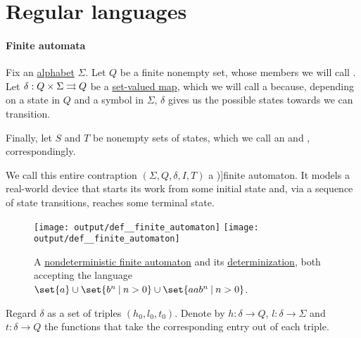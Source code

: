 \section{Regular languages}\label{sec:regular_languages}

\paragraph{Finite automata}

\begin{definition}\label{def:finite_automaton}
  Fix an \hyperref[def:formal_language]{alphabet} \( \Sigma \). Let \( Q \) be a finite nonempty set, whose members we will call . Let \( \delta: Q \times \Sigma \rightrightarrows Q \) be a \hyperref[def:set_valued_map]{set-valued map}, which we will call a  because, depending on a state in \( Q \) and a symbol in \( \Sigma \), \( \delta \) gives us the possible states towards we can transition.

  Finally, let \( S \) and \( T \) be nonempty sets of states, which we call an  and , correspondingly.

  We call this entire contraption \( (\Sigma, Q, \delta, I, T) \) a \term[ru=конечный автомат (\cite[159]{Гладкий1973ГрамматикиИЯзыки})]{finite automaton}. It models a real-world device that starts its work from some initial state and, via a sequence of state transitions, reaches some terminal state.

  \begin{figure}[!ht]
    \hfill
    \texttt{[image: output/def\_\_finite\_automaton]}
    \hfill
    \texttt{[image: output/def\_\_finite\_automaton]}
    \hfill\hfill
    \caption{A \hyperref[def:finite_automaton/determinism]{nondeterministic finite automaton} and its \hyperref[alg:determinization_of_finite_automata]{determinization}, both accepting the language \( \set{ a } \cup \set{ b^n \given n > 0 } \cup \set{ aa b^n \given n > 0 } \).}
    \label{fig:def:finite_automaton}
  \end{figure}

  \begin{thmenum}
    \mimprovised Regard \( \delta \) as a set of triples \( (h_0, l_0, t_0) \). Denote by \( h: \delta \to Q \), \( l: \delta \to \Sigma \) and \( t: \delta \to Q \) the functions that take the corresponding entry out of each triple.


\end{thmenum}
\end{definition}
